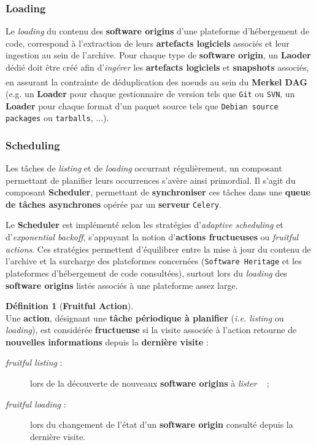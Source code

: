 \documentclass[12pt,a4paper]{report}
\theoremstyle{definition}
\newtheorem*{definition}{Définition}
\begin{document}
\subsubsection{Loading}
Le \textit{loading} du contenu des \textbf{software origins} d'une plateforme d'hébergement de code, correspond à l'extraction de leurs \textbf{artefacts logiciels} associés et leur ingestion au sein de l'archive. Pour chaque type de \textbf{software origin}, un \textbf{Laoder} dédié doit être créé afin d'\og \textit{ingérer} \fg les \textbf{artefacts logiciels} et \textbf{snapshots} associés, en assurant la contrainte de déduplication des noeuds au sein du \textbf{Merkel DAG}\textsuperscript{\citep{dicosmoWhyAndHow}} (e.g. un \textbf{Loader} pour chaque gestionnaire de version tels que \texttt{Git} ou \texttt{SVN}, un \textbf{Loader} pour chaque format d'un paquet source tels que \texttt{Debian source packages} ou \texttt{tarballs}, $\dots$).

\subsubsection{Scheduling}
Les tâches de \textit{listing} et de \textit{loading} occurrant régulièrement, un composant permettant de planifier leurs occurrences s'avère ainsi primordial. Il s'agit du composant \textbf{Scheduler}, permettant de \textbf{synchroniser} ces tâches dans une \textbf{queue de tâches asynchrones} opérée par un \textbf{serveur} \texttt{Celery}.

Le \textbf{Scheduler} est implémenté selon les stratégies d'\textit{adaptive scheduling} et d'\textit{exponential backoff}, s'appuyant la notion d'\textbf{actions fructueuses} ou \textit{fruitful actions}. Ces stratégies permettent d'équilibrer entre la mise à jour du contenu de l'archive et la surcharge des plateformes concernées (\texttt{Software Heritage} et les plateformes d'hébergement de code consultées), surtout lors du \textit{loading} des \textbf{software origins} listés associés à une plateforme assez large.

\begin{definition}[\textbf{Fruitful Action}]\mbox{}\\
Une \textbf{action}, désignant une \textbf{tâche périodique à planifier} (\textit{i.e. listing} ou \textit{loading}), est considérée \textbf{fructueuse}	si la visite associée à l'action retourne de \textbf{nouvelles informations} depuis la \textbf{dernière visite} :
\begin{description}
	\item [\textit{fruitful listing} :] lors de la découverte de nouveaux \textbf{software origins} à \og \textit{lister} \fg~ ;
	\item [\textit{fruitful loading} :] lors du changement de l'état d'un \textbf{software origin} consulté depuis la dernière visite.
\end{description}
\end{definition}
\end{document}

